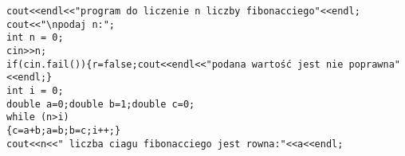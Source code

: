 \begin{verbatim}
cout<<endl<<"program do liczenie n liczby fibonacciego"<<endl;  
cout<<"\npodaj n:";
int n = 0;
cin>>n;
if(cin.fail()){r=false;cout<<endl<<"podana wartość jest nie poprawna"<<endl;}
int i = 0;
double a=0;double b=1;double c=0;
while (n>i)
{c=a+b;a=b;b=c;i++;}
cout<<n<<" liczba ciagu fibonacciego jest rowna:"<<a<<endl;
\end{verbatim}